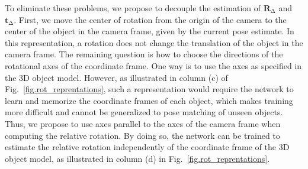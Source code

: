 \documentclass[twocolumn]{svjour3}
\newcommand{\rend}[0]{rendered}
\begin{document}
To eliminate these problems, we propose to decouple the estimation of $\mathbf{R}_\mathrm{\Delta}$ and $\mathbf{t}_\mathrm{\Delta}$. First, we move the center of rotation from the origin of the camera to the center of the object in the camera frame, given by the current pose estimate. In this representation, a rotation does not change the translation of the object in the camera frame. The remaining question is how to choose the directions of the rotational axes of the coordinate frame. One way is to use the axes as specified in the 3D object model. However, as illustrated in column (c) of Fig.~\ref{fig.rot_reprentations}, such a representation would require the network to learn and memorize the coordinate frames of each object, which makes  training more difficult and cannot be generalized to pose matching of unseen objects.  Thus, we propose to use axes parallel to the axes of the camera frame when computing the relative rotation. By doing so, the network can be trained to estimate the relative rotation independently of the coordinate frame of the 3D object model, as illustrated in column (d) in Fig.~\ref{fig.rot_reprentations}. 


\end{document}
